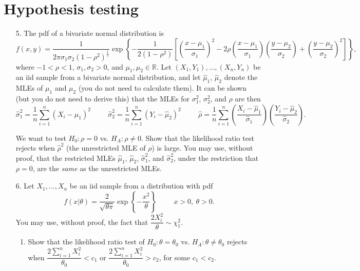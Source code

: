 \documentclass[11pt]{article}
\begin{document}
\section*{Hypothesis testing}

\begin{enumerate}
\item[5.] The pdf of a bivariate normal distribution is
$$f(x,y) = \frac{1}{2 \pi \sigma_1 \sigma_2 (1 - \rho^2)^{\frac{1}{2}}} \exp \left\lbrace  -\frac{1}{2(1 - \rho^2)}\left[ \left( \frac{x - \mu_1}{\sigma_1} \right)^2 - 2 \rho \left( \frac{x - \mu_1}{\sigma_1} \right)\left( \frac{y - \mu_2}{\sigma_2} \right)  + \left( \frac{y - \mu_2}{\sigma_2} \right)^2 \right]   \right\rbrace,$$
where $-1 < \rho < 1$, $\sigma_1, \sigma_2 > 0$, and $\mu_1, \mu_2 \in \mathbb{R}$. Let $(X_1, Y_1),...,(X_n, Y_n)$ be an iid sample from a bivariate normal distribution, and let $\widehat{\mu}_1$, $\widehat{\mu}_2$ denote the MLEs of $\mu_1$ and $\mu_2$ (you do not need to calculate them). It can be shown (but you do not need to derive this) that the MLEs for $\sigma_1^2$, $\sigma_2^2$, and $\rho$ are then
$$\widehat{\sigma}_1^2 = \frac{1}{n} \sum \limits_{i=1}^n (X_i - \widehat{\mu}_1)^2 \hspace{1cm} \widehat{\sigma}_2^2 = \frac{1}{n} \sum \limits_{i=1}^n (Y_i - \widehat{\mu}_2)^2 \hspace{1cm} \widehat{\rho} = \frac{1}{n} \sum \limits_{i=1}^n \left( \frac{X_i - \widehat{\mu}_1}{\widehat{\sigma}_1} \right) \left( \frac{Y_i - \widehat{\mu}_2}{\widehat{\sigma}_2} \right).$$

We want to test $H_0: \rho = 0$ vs. $H_A: \rho \neq 0$. Show that the likelihood ratio test rejects when $\widehat{\rho}^2$ (the unrestricted MLE of $\rho$) is large. You may use, without proof, that the restricted MLEs $\widehat{\mu}_1$, $\widehat{\mu}_2$, $\widehat{\sigma}_1^2$, and $\widehat{\sigma}_2^2$, under the restriction that $\rho = 0$, are the \textit{same} as the unrestricted MLEs.

\item[6.] Let $X_1,...,X_n$ be an iid sample from a distribution with pdf
$$f(x|\theta) = \frac{2}{\sqrt{\theta \pi}} \exp \left\lbrace -\frac{x^2}{\theta} \right\rbrace \hspace{1cm} x > 0, \ \theta > 0.$$
You may use, without proof, the fact that $\dfrac{2 X_i^2}{\theta} \sim \chi^2_1$.

\begin{enumerate}
\item Show that the likelihood ratio test of $H_0: \theta = \theta_0$ vs. $H_A: \theta \neq \theta_0$ rejects when $\dfrac{2 \sum \limits_{i=1}^n X_i^2}{\theta_0} < c_1$ or $\dfrac{2 \sum \limits_{i=1}^n X_i^2}{\theta_0} > c_2$, for some $c_1 < c_2$.


\end{enumerate}
\end{enumerate}
\end{document}
